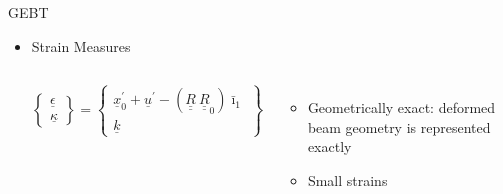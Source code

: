 \documentclass[dvips,xcolor=cmyk]{beamer}
\newcommand{\tens}[1]{\underline{\underline{#1}}}
\renewcommand{\vec}[1]{\underline{#1}}
\begin{document}
\begin{frame}{GEBT}
\begin{itemize}
    \item Strain Measures
    
    \begin{columns}[c]
    \column{2.0 in}
      \begin{equation*}
      \label{1DStrain}
      \begin{Bmatrix}
          \vec{\epsilon} \\
          \vec{\kappa}
      \end{Bmatrix}
      =
      \begin{Bmatrix}
          \vec{x}^\prime_0 + \vec{u}^\prime - (\tens{R} ~\tens{R}_0) \bar{\imath}_1 \\
          \vec{k} 
      \end{Bmatrix}
      \end{equation*}   
      
      \column{2.0 in}
        \begin{itemize}
        \scriptsize
          \pause
          \item
          Geometrically exact: deformed beam geometry is represented exactly
          \pause
          \item 
          Small strains
        \end{itemize}
      \end{columns}
    \end{itemize}

\end{frame}
\end{document}
